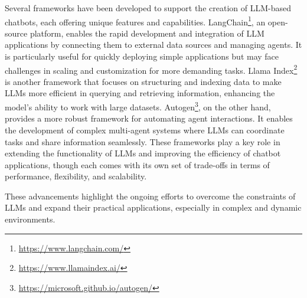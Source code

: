 \documentclass[runningheads]{llncs}
\begin{document}

Several frameworks have been developed to support the creation of LLM-based chatbots, each offering unique features and capabilities. LangChain\footnote{\url{https://www.langchain.com/}}, an open-source platform, enables the rapid development and integration of LLM applications by connecting them to external data sources and managing agents. It is particularly useful for quickly deploying simple applications but may face challenges in scaling and customization for more demanding tasks. Llama Index\footnote{\url{https://www.llamaindex.ai/}} is another framework that focuses on structuring and indexing data to make LLMs more efficient in querying and retrieving information, enhancing the model’s ability to work with large datasets. Autogen\footnote{\url{https://microsoft.github.io/autogen/}}, on the other hand, provides a more robust framework for automating agent interactions. It enables the development of complex multi-agent systems where LLMs can coordinate tasks and share information seamlessly. These frameworks play a key role in extending the functionality of LLMs and improving the efficiency of chatbot applications, though each comes with its own set of trade-offs in terms of performance, flexibility, and scalability.



These advancements highlight the ongoing efforts to overcome the constraints of LLMs and expand their practical applications, especially in complex and dynamic environments.

\end{document}
